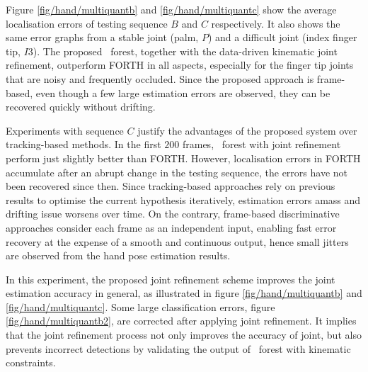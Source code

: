 Figure \ref{fig/hand/multiquantb} and \ref{fig/hand/multiquantc} show the average localisation errors of testing sequence $B$ and $C$ respectively. It also shows the same error graphs from a stable joint (palm, $P$) and a difficult joint (index finger tip, $I3$). The proposed \STR\ forest, together with the data-driven kinematic joint refinement, outperform FORTH in all aspects, especially for the finger tip joints that are noisy and frequently occluded. Since the proposed approach is frame-based, even though a few large estimation errors are observed, they can be recovered quickly without drifting.    

Experiments with sequence $C$ justify the advantages of the proposed system over tracking-based methods. In the first $200$ frames, \STR\ forest with joint refinement perform just slightly better than FORTH. However, localisation errors in FORTH accumulate after an abrupt change in the testing sequence, the errors have not been recovered since then. Since tracking-based approaches rely on previous results to optimise the current hypothesis iteratively, estimation errors amass and drifting issue worsens over time. On the contrary, frame-based discriminative approaches consider each frame as an independent input, enabling fast error recovery at the expense of a smooth and continuous output, hence small jitters are observed from the hand pose estimation results.  

In this experiment, the proposed joint refinement scheme improves the joint estimation accuracy in general, as illustrated in figure \ref{fig/hand/multiquantb} and \ref{fig/hand/multiquantc}. 
Some large classification errors, \eg figure \ref{fig/hand/multiquantb2}, are corrected after applying joint refinement. It implies that the joint refinement process not only improves the accuracy of joint, but also prevents incorrect detections by validating the output of \STR\ forest with kinematic constraints.

